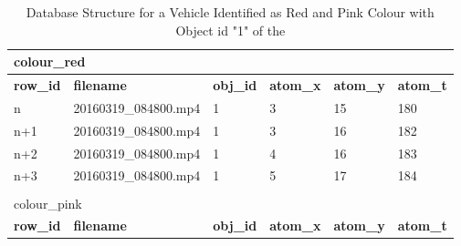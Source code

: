 \begin{table}[!hbt]
	\centering
\caption{Database Structure for a Vehicle Identified as Red and Pink Colour with Object id "1" of the \versionOneRet }
\label{table:dbSample}
\begin{tabular}{llllll}
\multicolumn{6}{l}{{ colour\_red}} \\ \hline
\multicolumn{1}{|l|}{\textbf{row\_id}} & \multicolumn{1}{l|}{\textbf{filename}}    & \multicolumn{1}{l|}{\textbf{obj\_id}} & \multicolumn{1}{l|}{\textbf{atom\_x}} & \multicolumn{1}{l|}{\textbf{atom\_y}} & \multicolumn{1}{l|}{\textbf{atom\_t}} \\ \hline
\multicolumn{1}{|l|}{n}                & \multicolumn{1}{l|}{20160319\_084800.mp4} & \multicolumn{1}{l|}{1}                & \multicolumn{1}{l|}{3}                & \multicolumn{1}{l|}{15}               & \multicolumn{1}{l|}{180}              \\ \hline
\multicolumn{1}{|l|}{n+1}              & \multicolumn{1}{l|}{20160319\_084800.mp4} & \multicolumn{1}{l|}{1}                & \multicolumn{1}{l|}{3}                & \multicolumn{1}{l|}{16}               & \multicolumn{1}{l|}{182}              \\ \hline
\multicolumn{1}{|l|}{n+2}              & \multicolumn{1}{l|}{20160319\_084800.mp4} & \multicolumn{1}{l|}{1}                & \multicolumn{1}{l|}{4}                & \multicolumn{1}{l|}{16}               & \multicolumn{1}{l|}{183}              \\ \hline
\multicolumn{1}{|l|}{n+3}              & \multicolumn{1}{l|}{20160319\_084800.mp4} & \multicolumn{1}{l|}{1}                & \multicolumn{1}{l|}{5}                & \multicolumn{1}{l|}{17}               & \multicolumn{1}{l|}{184}              \\ \hline
                                       &                                           &                                       &                                       &                                       &                                       \\
\multicolumn{6}{l}{{ colour\_pink}}                                                                                                                                                                                                              \\ \hline
\multicolumn{1}{|l|}{\textbf{row\_id}} & \multicolumn{1}{l|}{\textbf{filename}}    & \multicolumn{1}{l|}{\textbf{obj\_id}} & \multicolumn{1}{l|}{\textbf{atom\_x}} & \multicolumn{1}{l|}{\textbf{atom\_y}} & \multicolumn{1}{l|}{\textbf{atom\_t}} \\ \hline

\end{tabular}
\end{table}
